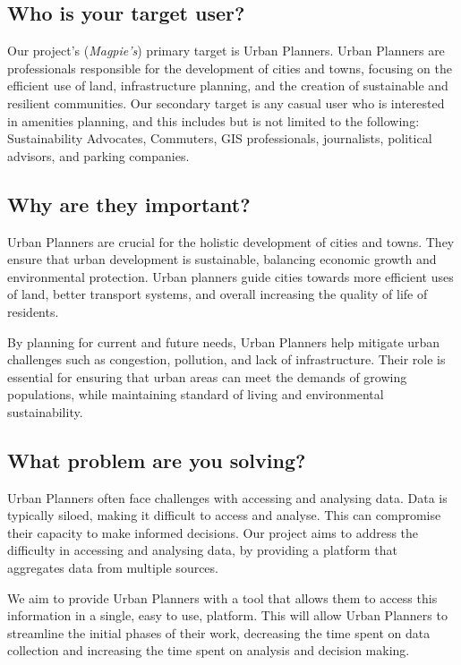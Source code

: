 \subsection{Who is your target user?}
Our project's (\textit{Magpie's}) primary target is Urban Planners. Urban
Planners are professionals responsible for the development of cities and towns,
focusing on the efficient use of land, infrastructure planning, and the creation
of sustainable and resilient communities. Our secondary target is any casual
user who is interested in amenities planning, and this includes but is not
limited to the following: Sustainability Advocates, Commuters, GIS
professionals, journalists, political advisors, and parking companies.

\subsection{Why are they important?}
Urban Planners are crucial for the holistic development of cities and towns.
They ensure that urban development is sustainable, balancing economic growth and
environmental protection. Urban planners guide cities towards more efficient
uses of land, better transport systems, and overall increasing the quality of
life of residents.

\noindent{}By planning for current and future needs, Urban Planners help mitigate urban
challenges such as congestion, pollution, and lack of infrastructure. Their role
is essential for ensuring that urban areas can meet the demands of growing
populations, while maintaining standard of living and environmental
sustainability.

\subsection{What problem are you solving?}
Urban Planners often face challenges with accessing and analysing data. Data is
typically siloed, making it difficult to access and analyse. This can compromise
their capacity to make informed decisions. Our project aims to address the
difficulty in accessing and analysing data, by providing a platform that
aggregates data from multiple sources.

\noindent{}We aim to provide Urban Planners with a tool that allows them to access this
information in a single, easy to use, platform. This will allow Urban Planners
to streamline the initial phases of their work, decreasing the time spent on
data collection and increasing the time spent on analysis and decision making.

\newpage{}